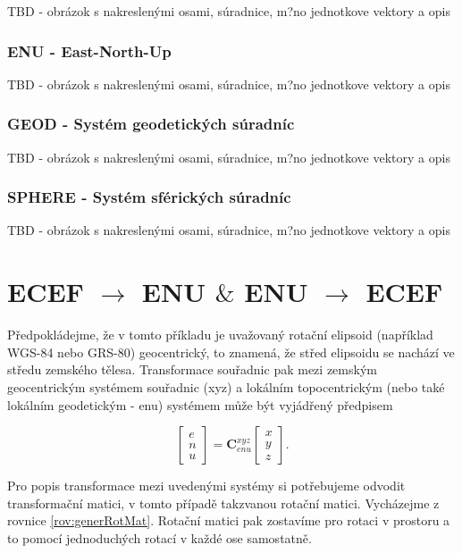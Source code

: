 \documentclass[11pt,a4paper]{article}
\begin{document}
TBD - obrázok s nakreslenými osami, súradnice, m?no jednotkove vektory a opis

\subsubsection{ENU - East-North-Up}

TBD - obrázok s nakreslenými osami, súradnice, m?no jednotkove vektory a opis

\subsubsection{GEOD - Systém geodetických súradníc}

TBD - obrázok s nakreslenými osami, súradnice, m?no jednotkove vektory a opis

\subsubsection{SPHERE - Systém sférických súradníc}

TBD - obrázok s nakreslenými osami, súradnice, m?no jednotkove vektory a opis

\section{ECEF $\rightarrow$ ENU $\&$ ENU $\rightarrow$ ECEF}

Předpokládejme, že v tomto příkladu je uvažovaný rotační elipsoid (například WGS-84 nebo GRS-80) geocentrický, to znamená, že střed elipsoidu se nachází ve středu zemského tělesa. Transformace souřadnic pak mezi zemským geocentrickým systémem souřadnic (xyz) a lokálním topocentrickým (nebo také lokálním geodetickým - enu) systémem může být vyjádřený předpisem \cite{Soler1998}

\begin{equation}
\begin{bmatrix}
e \\
n \\
u
\end{bmatrix} = 
\mathbf{C}_{enu}^{xyz}
\begin{bmatrix}
x \\
y \\
z
\end{bmatrix}.
\label{rov:ecef2enu1}
\end{equation}

Pro popis transformace mezi uvedenými systémy si potřebujeme odvodit transformační matici, v tomto případě takzvanou rotační matici. Vycházejme z rovnice \ref{rov:generRotMat}. Rotační matici pak zostavíme pro rotaci v prostoru a to pomocí jednoduchých rotací v každé ose samostatně.
\end{document}
